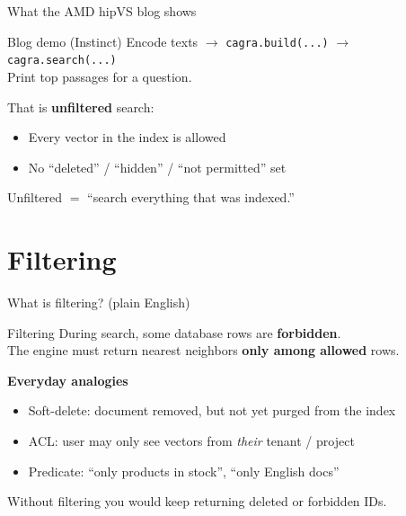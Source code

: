 \documentclass[aspectratio=169,11pt]{beamer}
\begin{document}
\begin{frame}{What the AMD hipVS blog shows}
  \begin{block}{Blog demo (Instinct)}
    Encode texts $\to$ \texttt{cagra.build(...)} $\to$ \texttt{cagra.search(...)}\\
    Print top passages for a question.
  \end{block}

  \vspace{0.6em}
  That is \textbf{unfiltered} search:
  \begin{itemize}
    \item Every vector in the index is allowed
    \item No ``deleted'' / ``hidden'' / ``not permitted'' set
  \end{itemize}

  \vspace{0.5em}
  \begin{center}
    \large Unfiltered $=$ ``search everything that was indexed.''
  \end{center}
\end{frame}

\section{Filtering}
\begin{frame}{What is filtering? (plain English)}
  \begin{block}{Filtering}
    During search, some database rows are \textbf{forbidden}.\\
    The engine must return nearest neighbors \textbf{only among allowed} rows.
  \end{block}

  \vspace{0.6em}
  \textbf{Everyday analogies}
  \begin{itemize}
    \item Soft-delete: document removed, but not yet purged from the index
    \item ACL: user may only see vectors from \emph{their} tenant / project
    \item Predicate: ``only products in stock'', ``only English docs''
  \end{itemize}

  \vspace{0.5em}
  Without filtering you would keep returning deleted or forbidden IDs.
\end{frame}
\end{document}
